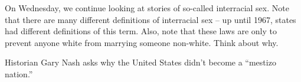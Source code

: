 On Wednesday, we continue looking at stories of so-called interracial sex. Note that there are many different definitions of interracial sex -- up until 1967, states had different definitions of this term. Also, note that these laws are only to prevent anyone white from marrying someone non-white. Think about why.

Historian Gary Nash asks why the United States didn't become a ``mestizo nation.''